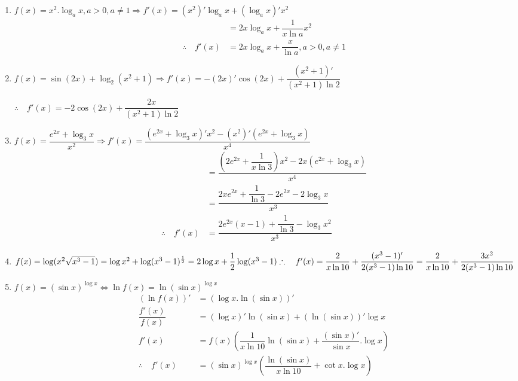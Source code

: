 \documentclass[a4paper,12pt]{article}
\begin{document}
\solution
\begin{enumerate}
	\item $f(x)=x^2.\log_a x, a>0,a\neq 1\Longrightarrow f'(x)=(x^2)'\log_a x+\left(\log_a x \right)'x^2$
	      \begin{align*}
		                             & =2x\log_a x+\dfrac{1}{x\ln a}x^2            \\
		      \therefore \quad f'(x) & =2x\log _a x+\dfrac{x}{\ln a} , a>0,a\neq 1
	      \end{align*}
	\item $f(x)=\sin (2x)+\log_2 (x^2+1)\Longrightarrow f'(x)=-(2x)'\cos (2x)+\dfrac{(x^2+1)'}{(x^2+1)\ln 2}$
	      \begin{center}
		      $\therefore \quad f'(x)=-2\cos(2x)+\dfrac{2x}{(x^2+1)\ln 2}$
	      \end{center}
	\item $f(x)=\dfrac{e^{2x}+\log_3 x}{x^2}\Longrightarrow f'(x)=\dfrac{(e^{2x}+\log_3 x)'x^2-(x^2)'(e^{2x}+\log_3 x)}{x^4}$
	      \begin{align*}
		                             & =\dfrac{(2e^{2x}+\dfrac{1}{x\ln 3})x^2-2x(e^{2x}+\log_3 x)}{x^4} \\
		                             & =\dfrac{2xe^{2x}+\dfrac{1}{\ln 3}-2e^{2x}-2\log_3 x}{x^3}        \\
		      \therefore \quad f'(x) & =\dfrac{2e^{2x}(x-1)+\dfrac{1}{\ln 3}-\log_3x^2}{x^3}
	      \end{align*}
	\item $f(x)=\log (x^2 \sqrt{x^3-1})=\log x^2 +\log (x^3-1)^{\frac{1}{2}}=2\log x+\dfrac{1}{2}\log (x^3-1)\\
		      \therefore \quad f'(x)=\dfrac{2}{x\ln 10}+\dfrac{(x^3-1)'}{2(x^3-1)\ln 10}=\dfrac{2}{x\ln 10}+\dfrac{3x^2}{2(x^3-1)\ln 10} $
	\item $f(x)=(\sin x)^{\log x}\Longleftrightarrow \ln f(x)=\ln (\sin x)^{\log x}$
	      \begin{align*}
		      \left(\ln f(x) \right)' & =(\log x. \ln (\sin x))'                                                            \\
		      \dfrac{f'(x)}{f(x)}     & =(\log x)'\ln (\sin x)+(\ln (\sin x))'\log x                                        \\
		      f'(x)                   & =f(x)\left(\dfrac{1}{x\ln 10}\ln (\sin x)+\dfrac{(\sin x)' }{\sin x}.\log x \right) \\
		      \therefore \quad f'(x)  & =(\sin x)^{\log x}\left(\dfrac{\ln (\sin x)}{x\ln 10} +\cot x.\log x\right)

\end{align*}
\end{enumerate}
\end{document}
